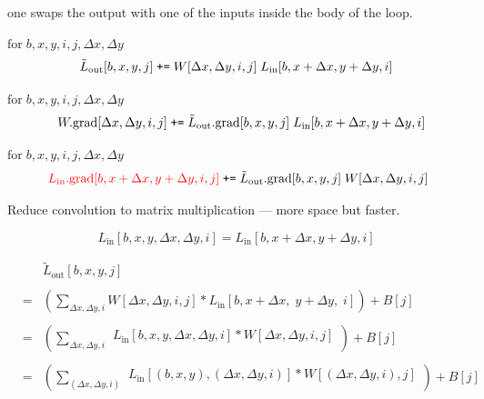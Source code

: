 {\vfill
one swaps the output with one of the inputs inside the body of the loop.


\vfill
{\color{red} $\mathrm{for}\;b,x,y,i,j,\Delta x, \Delta y$}
$$\tilde{L}_{\mathrm{out}}[b,x,y,j] \;\mbox{\tt +=}\; W[\Delta x, \Delta y, i, j]\;L_{\mathrm{in}}[b,x + \Delta x, y + \Delta y, i]$$

\vfill
{\color{red} $\mathrm{for}\;b,x,y,i,j,\Delta x, \Delta y$ }
$$\;\;\;W.\mathrm{grad}[\Delta x, \Delta y,i,j] \; \mbox{\tt +=} \; \tilde{L}_{\mathrm{out}}.\mathrm{grad}[b,x,y,j]\;L_{\mathrm{in}}[b,x + \Delta x,y+ \Delta y,i]$$

\vfill
{\color{red} $\mathrm{for}\;b,x,y,i,j,\Delta x, \Delta y$}
$$\;{\color{red} L_{\mathrm{in}}.\mathrm{grad}[b,x+\Delta x,y+\Delta y,i,j]} \;\mbox{\tt +=} \; \tilde{L}_{\mathrm{out}}.\mathrm{grad}[b,x,y,j]\;W[\Delta x, \Delta y, i, j]$$



Reduce convolution to matrix multiplication ---  more space but faster.
{\huge
  $$L_{\mathrm{in}}[b,x,y,\Delta x,\Delta y,i] = L_{\mathrm{in}}[b,x+\Delta x,y+\Delta y,i]$$

\begin{eqnarray*}
  & & \tilde{L}_{\mathrm{out}}[b,x,y,j] \\
  \\
  & = & \left(\sum_{\Delta x, \Delta y, i} W[\Delta x, \Delta y, i, j] *L_{\mathrm{in}}[b,x + \Delta x,\; y + \Delta y,\; i]\right) + B[j] \\
  \\
      & = & \left(\sum_{\Delta x, \Delta y, i} \begin{array}{l}
                                              L_{\mathrm{in}}[b,x,y,\Delta x,\Delta y,i]
                                              * W[\Delta x, \Delta y, i, j] \\
  \end{array}\right) + B[j] \\
  \\
    & = & \left(\sum_{(\Delta x, \Delta y, i)} \begin{array}{l}
                                              L_{\mathrm{in}}[(b,x,y),(\Delta x,\Delta y,i)]
                                              * W[(\Delta x, \Delta y, i), j] \\
                                           \end{array}\right) + B[j]
\end{eqnarray*}
}

}
